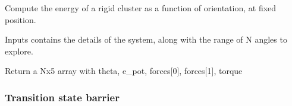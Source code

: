 \documentclass[letterpaper,10pt,english]{sphinxmanual}
\begin{document}
\begin{fulllineitems}
\label{\detokenize{static_roto_map:static_roto_map.static_rotomap}}
\pysigstartsignatures
{}
\pysigstopsignatures
\sphinxAtStartPar
Compute the energy of a rigid cluster as a function of orientation, at fixed position.

\sphinxAtStartPar
Inputs contains the details of the system, along with the range of N angles to explore.

\sphinxAtStartPar
Return a Nx5 array with theta, e\_pot, forces{[}0{]}, forces{[}1{]}, torque

\end{fulllineitems}


\sphinxstepscope


\subsubsection{Transition state barrier}
\label{\detokenize{static_barrier_string:module-static_barrier_string}}\label{\detokenize{static_barrier_string:transition-state-barrier}}\label{\detokenize{static_barrier_string::doc}}
\end{document}
